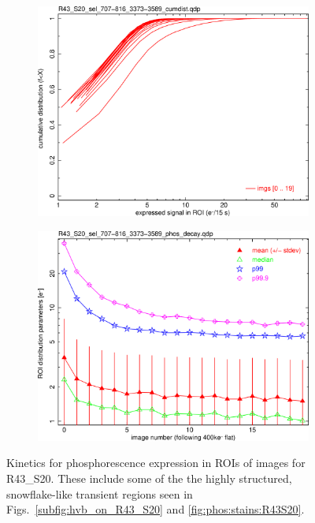 \begin{figure}[!htbp]
\begin{subfigure}{0.45\textwidth}
  \includegraphics[width=\textwidth]{figures/phosphorescence-survey/phos_kinetics/R43_S20_sel_707-816_3373-3589_cumdist.png}    
\end{subfigure}
\hfil
\begin{subfigure}{0.45\textwidth}
  \centering
  \includegraphics[width=\textwidth]{figures/phosphorescence-survey/phos_kinetics/R43_S20_sel_707-816_3373-3589_phos_decay.png}
\end{subfigure}
\newline
\caption{Kinetics for phosphorescence expression in ROIs of images for R43\_S20. These include some of the the highly structured, snowflake-like transient regions seen in Figs.~\ref{subfig:hvb_on_R43_S20} and \ref{fig:phos:stains:R43S20}.}
\label{fig:phos:kinetics:R43S20}
\end{figure}

